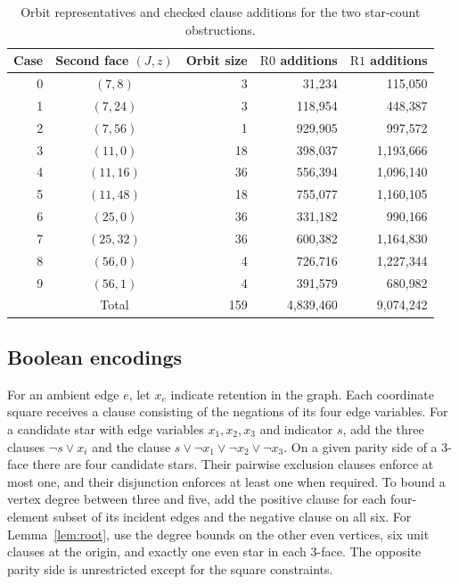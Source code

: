 \documentclass[11pt,reqno]{amsart}
\numberwithin{equation}{section}
\begin{document}
\begin{table}[htbp]
\centering
\small
\begin{tabular}{@{}rcrrr@{}}
\toprule
Case & Second face \((J,z)\) & Orbit size &
\(\mathrm{R0}\) additions & \(\mathrm{R1}\) additions\\
\midrule
0 & \((7,8)\)   &  3 &    31{,}234 &   115{,}050\\
1 & \((7,24)\)  &  3 &   118{,}954 &   448{,}387\\
2 & \((7,56)\)  &  1 &   929{,}905 &   997{,}572\\
3 & \((11,0)\)  & 18 &   398{,}037 & 1{,}193{,}666\\
4 & \((11,16)\) & 36 &   556{,}394 & 1{,}096{,}140\\
5 & \((11,48)\) & 18 &   755{,}077 & 1{,}160{,}105\\
6 & \((25,0)\)  & 36 &   331{,}182 &   990{,}166\\
7 & \((25,32)\) & 36 &   600{,}382 & 1{,}164{,}830\\
8 & \((56,0)\)  &  4 &   726{,}716 & 1{,}227{,}344\\
9 & \((56,1)\)  &  4 &   391{,}579 &   680{,}982\\
\midrule
 & Total & 159 & 4{,}839{,}460 & 9{,}074{,}242\\
\bottomrule
\end{tabular}
\caption{Orbit representatives and checked clause additions for the
two star-count obstructions.}\label{tab:orbits}
\end{table}

\subsection{Boolean encodings}\label{app:encoding}

For an ambient edge \(e\), let \(x_e\) indicate retention in the graph.
Each coordinate square receives a clause consisting of the negations
of its four edge variables. For a candidate star with edge variables
\(x_1,x_2,x_3\) and indicator \(s\), add the three clauses
\(\neg s\vee x_i\) and the clause
\(s\vee\neg x_1\vee\neg x_2\vee\neg x_3\).
On a given parity side of a \(3\)-face there are four candidate stars.
Their pairwise exclusion clauses enforce at most one, and their
disjunction enforces at least one when required. To bound a vertex
degree between three and five, add the positive clause for each
four-element subset of its incident edges and the negative clause on
all six. For Lemma~\ref{lem:root}, use the degree bounds on the other
even vertices, six unit clauses at the origin, and exactly one even
star in each \(3\)-face. The opposite parity side is unrestricted
except for the square constraints.
\end{document}
